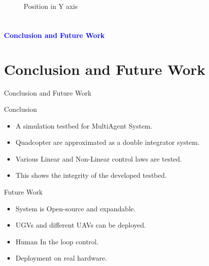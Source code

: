 \documentclass[10pt]{beamer}
\begin{document}
\begin{frame}
\begin{minipage}{0.47\textwidth}
\begin{figure}[h!]
			\caption{Position in Y axis}
			\label{Fig:pos_y_m}
		\end{figure}
	\end{minipage}
\end{frame}


\section*{}
\begin{frame}{}
	\huge{\centerline{\textcolor{blue}{\textbf{Conclusion and Future Work}}}}
\end{frame}

\section{Conclusion and Future Work}
\begin{frame}{Conclusion and Future Work}
	\begin{block}{Conclusion}
		\begin{itemize}
			\item A simulation testbed for MultiAgent System.
			\item Quadcopter are approximated as a double integrator system.
			\item Various Linear and Non-Linear control laws are tested.
			\item This shows the integrity of the developed testbed.
		\end{itemize}
	\end{block}

	\pause \begin{block}{Future Work}
		\begin{itemize}
			\item System is Open-source and expandable.
			\item UGVs and different UAVs can be deployed.
			\item Human In the loop control.
			\item Deployment on real hardware.
		\end{itemize}
	\end{block}
\end{frame}
\end{document}

